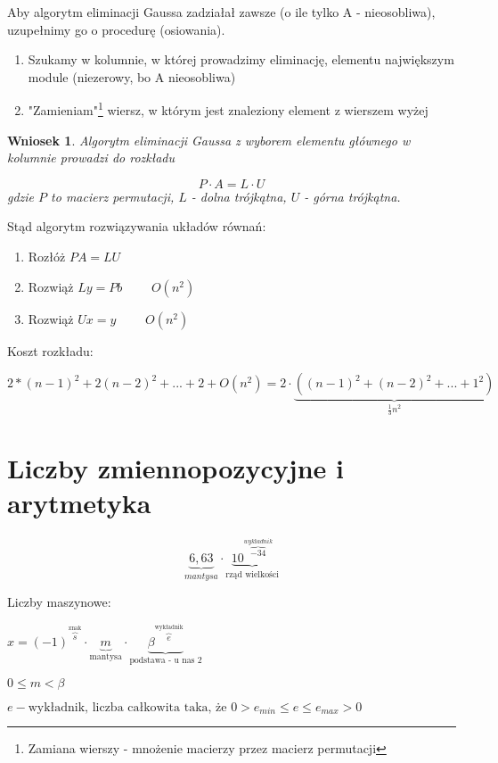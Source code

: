 \documentclass[hidelinks,a4paper,fleqn]{article}
\newtheorem{wniosek}{Wniosek}
\begin{document}
Aby algorytm eliminacji Gaussa zadziałał zawsze (o ile tylko A - nieosobliwa), uzupełnimy go o procedurę  (osiowania). 

\begin{enumerate}
	\item Szukamy w kolumnie, w której prowadzimy eliminację, elementu  największym module (niezerowy, bo A nieosobliwa)
	\item "Zamieniam"\footnote{Zamiana wierszy - mnożenie macierzy przez macierz permutacji} wiersz, w którym jest znaleziony element z wierszem wyżej 
\end{enumerate}


\begin{wniosek} Algorytm eliminacji Gaussa z wyborem elementu głównego w kolumnie prowadzi do rozkładu
	
	\[
		P \cdot A = L \cdot U
	\]
	gdzie $P$ to macierz permutacji, $L$ - dolna trójkątna, $U$ - górna trójkątna.
	
\end{wniosek}

Stąd algorytm rozwiązywania układów równań:

\begin{enumerate}
	\item Rozłóż $PA = LU$
	\item Rozwiąż $Ly= Pb$ $\quad\quad O(n^2)$
	\item Rozwiąż $Ux = y$ $\quad\quad O(n^2)$
\end{enumerate}

Koszt rozkładu:

$2*(n-1)^2 + 2(n-2)^2 + ... + 2 + O(n^2) = 2 \cdot \underbrace{((n-1)^2 + (n-2)^2 + ... + 1^2)}_{\frac{1}{3}n^2}$


\section{Liczby zmiennopozycyjne i arytmetyka}

\[
	\underbrace{6,63}_{mantysa} \cdot \underbrace{10^{\overbrace{-34}^{wykładnik}}}_{\textrm{rząd wielkości}}
\]

Liczby maszynowe:

$x = (-1)^{\overbrace{s}^{\textrm{znak}}} \cdot \underbrace{m}_{\textrm{mantysa}} \cdot \underbrace{\beta^{\overbrace{e}^{\textrm{wykładnik}}}}_{\textrm{podstawa - u nas 2}}$

$0 \leq m < \beta$

$e - \textrm{wykładnik, liczba całkowita taka, że } 0 > e_{min} \leq e \leq e_{max} > 0$
\end{document}
